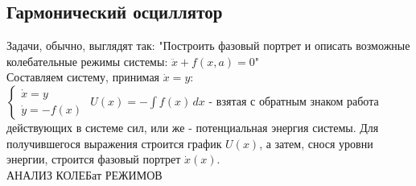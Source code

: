 \newcommand{\colontitulAutors}{astronom\_v\_cube, edombek et al.}
\newcommand{\colontitulYear}{2022}
\newcommand{\colontitulEducationalSubject}{Алгоритмы решения задач по теории колебаний}
\newcommand{\colontitulTeacher}{Сутягин А.А.}




	\small
	\begin{multicols*}{2}

		\section{Гармонический осциллятор}

		Задачи, обычно, выглядят так:
		"Построить фазовый портрет и описать возможные колебательные режимы системы: $ \ddot{x} + f(x, a) = 0 $"\\
		Составляем систему, принимая $\dot{x} = y$:\\
		$\begin{cases}
			\dot{x} = y \\
			\dot{y} = -f(x)
		\end{cases} $
		$U(x) = -\int f(x) \,dx $ - взятая с обратным знаком работа действующих в системе сил, или же - потенциальная энергия системы. Для  получившегося выражения строится график $U(x)$, а затем, снося уровни энергии, строится фазовый портрет $\dot{x}(x)$.\\
		АНАЛИЗ КОЛЕБат РЕЖИМОВ


\end{multicols*}
